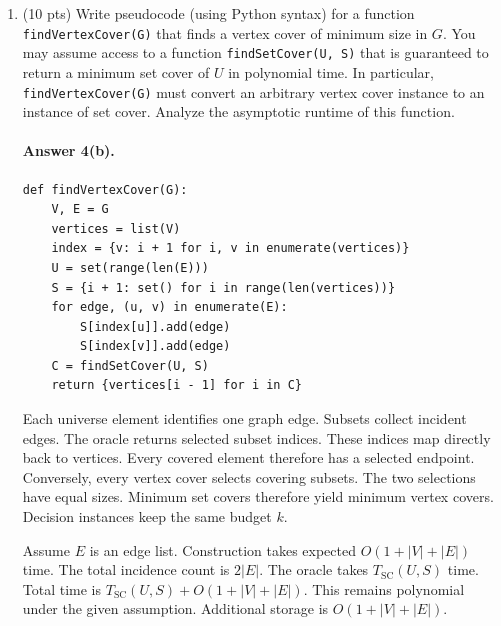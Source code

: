 \documentclass{article}
\begin{document}
\begin{enumerate}
\begin{enumerate}
Define the selected input size below.
\[
L_C=\sum_{i\in C}|S_i|.
\]
Expected runtime is $O(1+|C|+L_C+|U|)$.
Hash operations take expected constant time.
Auxiliary space is $O(1+|U|)$.
This uses the given assumption $S_i\subseteq U$.

        \item (10 pts) Write pseudocode (using Python syntax) for a function \verb|findVertexCover(G)| that finds a vertex cover of minimum size in $G$. You may assume access to a function \verb|findSetCover(U, S)| that is guaranteed to return a minimum set cover of $U$ in polynomial time. In particular, \verb|findVertexCover(G)| must convert an arbitrary vertex cover instance to an instance of set cover. Analyze the asymptotic runtime of this function. \\


\paragraph{Answer 4(b).}\mbox{}\par
\par\noindent\begin{minipage}{\linewidth}
\begin{lstlisting}
def findVertexCover(G):
    V, E = G
    vertices = list(V)
    index = {v: i + 1 for i, v in enumerate(vertices)}
    U = set(range(len(E)))
    S = {i + 1: set() for i in range(len(vertices))}
    for edge, (u, v) in enumerate(E):
        S[index[u]].add(edge)
        S[index[v]].add(edge)
    C = findSetCover(U, S)
    return {vertices[i - 1] for i in C}
\end{lstlisting}
\end{minipage}\par

Each universe element identifies one graph edge.
Subsets collect incident edges.
The oracle returns selected subset indices.
These indices map directly back to vertices.
Every covered element therefore has a selected endpoint.
Conversely, every vertex cover selects covering subsets.
The two selections have equal sizes.
Minimum set covers therefore yield minimum vertex covers.
Decision instances keep the same budget $k$.

Assume $E$ is an edge list.
Construction takes expected $O(1+|V|+|E|)$ time.
The total incidence count is $2|E|$.
The oracle takes $T_{\mathrm{SC}}(U,S)$ time.
Total time is $T_{\mathrm{SC}}(U,S)+O(1+|V|+|E|)$.
This remains polynomial under the given assumption.
Additional storage is $O(1+|V|+|E|)$.

    \end{enumerate}
\end{enumerate}
\end{document}
